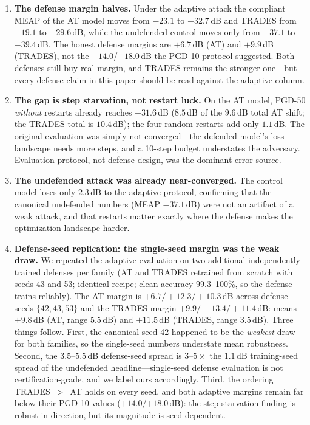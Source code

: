 \documentclass[review]{elsarticle}
\begin{document}
\begin{enumerate}
\item \textbf{The defense margin halves.} Under the adaptive attack the
compliant MEAP of the AT model moves from $-23.1$ to $-32.7$\,dB and
TRADES from $-19.1$ to $-29.6$\,dB, while the undefended control moves
only from $-37.1$ to $-39.4$\,dB. The honest defense margins are
$+6.7$\,dB (AT) and $+9.9$\,dB (TRADES), not the $+14.0$/$+18.0$\,dB
the PGD-10 protocol suggested. Both defenses still buy real margin, and
TRADES remains the stronger one---but every defense claim in this paper
should be read against the adaptive column.
\item \textbf{The gap is step starvation, not restart luck.} On the AT
model, PGD-50 \emph{without} restarts already reaches $-31.6$\,dB
($8.5$\,dB of the $9.6$\,dB total AT shift; the TRADES total is $10.4$\,dB); the four random restarts add
only $1.1$\,dB. The original evaluation was simply not converged---the
 defended model's loss landscape needs more steps, and a 10-step budget
understates the adversary. Evaluation protocol, not defense design, was
the dominant error source.
\item \textbf{The undefended attack was already near-converged.} The
control model loses only $2.3$\,dB to the adaptive protocol, confirming
that the canonical undefended numbers (MEAP $-37.1$\,dB) were not an
artifact of a weak attack, and that restarts matter exactly where the
defense makes the optimization landscape harder.
\item \textbf{Defense-seed replication: the single-seed margin was the weak
draw.} We repeated the adaptive evaluation on two additional independently
trained defenses per family (AT and TRADES retrained from scratch with
seeds 43 and 53; identical recipe; clean accuracy 99.3--100\%, so the
defense trains reliably). The AT margin is
$+6.7/+12.3/+10.3$\,dB across defense seeds $\{42,43,53\}$ and the TRADES
margin $+9.9/+13.4/+11.4$\,dB: means $+9.8$\,dB (AT, range $5.5$\,dB) and
$+11.5$\,dB (TRADES, range $3.5$\,dB). Three things follow. First, the
canonical seed 42 happened to be the \emph{weakest} draw for both families,
so the single-seed numbers understate mean robustness. Second, the
$3.5$--$5.5$\,dB defense-seed spread is $3$--$5\times$ the $1.1$\,dB
training-seed spread of the undefended headline---single-seed defense
evaluation is not certification-grade, and we label ours accordingly.
Third, the ordering TRADES~$>$~AT holds on every seed, and both adaptive
margins remain far below their PGD-10 values ($+14.0$/$+18.0$\,dB): the
step-starvation finding is robust in direction, but its magnitude is
seed-dependent.
\end{enumerate}
\end{document}
